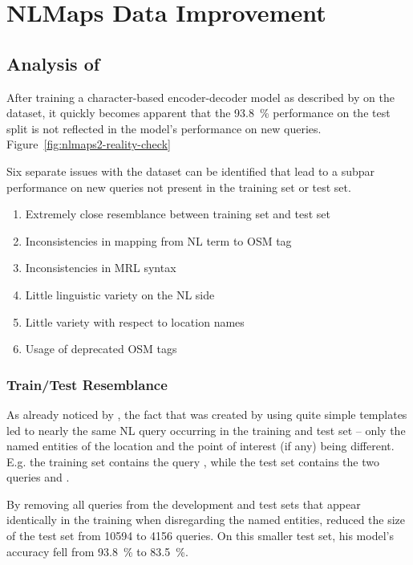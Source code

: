 \chapter{NLMaps Data Improvement}
\label{ch:nlmaps-improvement}

\section{Analysis of \nlmapstwo{}}

After training a character-based encoder-decoder model as described by
\textcite{staniek-2020} on the \nlmapstwo{} dataset, it quickly becomes
apparent that the \SI{93.8}{\%} performance on the test split is not reflected
in the model’s performance on new queries. Figure~\ref{fig:nlmaps2-reality-check}

Six separate issues with the \nlmapstwo{} dataset can be identified that lead to
a subpar performance on new queries not present in the training set or test set.

\begin{enumerate}
\item Extremely close resemblance between training set and test set
\item Inconsistencies in mapping from NL term to OSM tag
\item Inconsistencies in MRL syntax
\item Little linguistic variety on the NL side
\item Little variety with respect to location names
\item Usage of deprecated OSM tags
\end{enumerate}

\subsection{Train/Test Resemblance}

As already noticed by \textcite{staniek-2020}, the fact that \nlmapstwo{} was
created by using quite simple templates led to nearly the same NL query
occurring in the training and test set – only the named entities of the location
and the point of interest (if any) being different. E.g. the training set
contains the query , while the test set
contains the two queries  and .

By removing all queries from the development and test sets that appear
identically in the training when disregarding the named entities,
\textcite{staniek-2020} reduced the size of the test set from \num{10594}
to \num{4156} queries. On this smaller test set, his model’s accuracy fell from
\SI{93.8}{\%} to \SI{83.5}{\%}.

